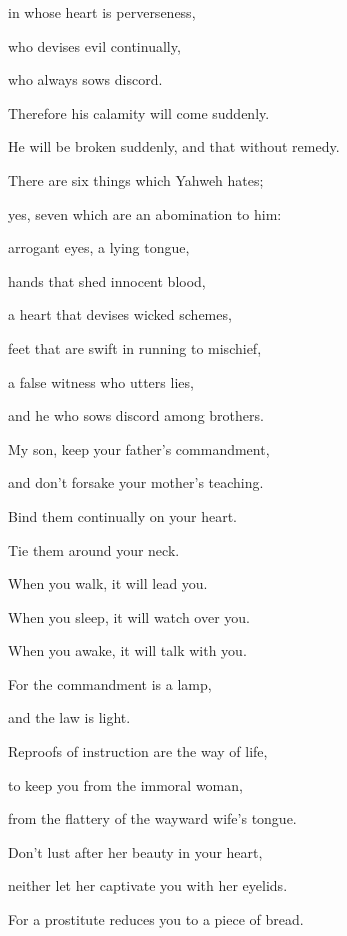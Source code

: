 {\par }{\Q {}in whose heart is perverseness,
\par }{\QB who devises evil continually,
\par }{\QB who always sows discord.
\par }{\Q {}Therefore his calamity will come suddenly.
\par }{\QB He will be broken suddenly, and that without remedy.
\par }{\BB \par }{\Q {}There are six things which Yahweh hates;
\par }{\QB yes, seven which are an abomination to him:
\par }{\Q {}arrogant eyes, a lying tongue,
\par }{\QB hands that shed innocent blood,
\par }{\Q {}a heart that devises wicked schemes,
\par }{\QB feet that are swift in running to mischief,
\par }{\Q {}a false witness who utters lies,
\par }{\QB and he who sows discord among brothers.
\par }{\BB \par }{\Q {}My son, keep your father’s commandment,
\par }{\QB and don’t forsake your mother’s teaching.
\par }{\Q {}Bind them continually on your heart.
\par }{\QB Tie them around your neck.
\par }{\Q {}When you walk, it will lead you.
\par }{\QB When you sleep, it will watch over you.
\par }{\QB When you awake, it will talk with you.
\par }{\Q {}For the commandment is a lamp,
\par }{\QB and the law is light.
\par }{\QB Reproofs of instruction are the way of life,
\par }{\Q {}to keep you from the immoral woman,
\par }{\QB from the flattery of the wayward wife’s tongue.
\par }{\Q {}Don’t lust after her beauty in your heart,
\par }{\QB neither let her captivate you with her eyelids.
\par }{\Q {}For a prostitute reduces you to a piece of bread.
}
